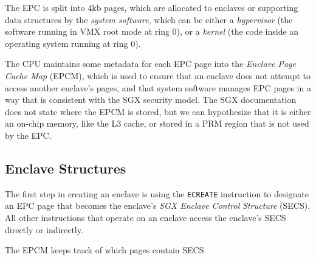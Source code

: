 The EPC is split into 4kb pages, which are allocated to enclaves or supporting
data structures by the \textit{system software}, which can be either a
\textit{hypervisor} (the software running in VMX root mode at ring 0), or a
\textit{kernel} (the code inside an operating system running at ring 0).

The CPU maintains some metadata for each EPC page into the \textit{Enclave Page
Cache Map} (EPCM), which is used to ensure that an enclave does not attempt to
access another enclave's pages, and that system software manages EPC pages in a
way that is consistent with the SGX security model. The SGX documentation does
not state where the EPCM is stored, but we can hypothesize that it is either
an on-chip memory, like the L3 cache, or stored in a PRM region that is not
used by the EPC.



\subsection{Enclave Structures}


The first step in creating an enclave is using the \texttt{ECREATE} instruction
to designate an EPC page that becomes the enclave's \textit{SGX Enclave Control
Structure} (SECS). All other instructions that operate on an enclave access the
enclave's SECS directly or indirectly.



The EPCM keeps track of which pages contain SECS







